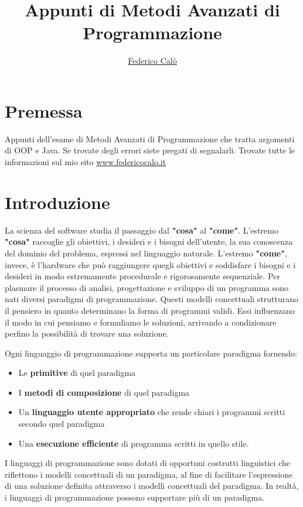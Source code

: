 \documentclass[a4paper,18pt]{extarticle}
\title{Appunti di Metodi Avanzati di Programmazione}
\author{\href{http://www.federicocalo.it}{Federico Calò} }
\date{}
\begin{document}
\maketitle

\newpage

\tableofcontents

\newpage
\section{ Premessa}
Appunti dell'esame di Metodi Avanzati di Programmazione che tratta argomenti di OOP e Java. Se trovate degli errori siete pregati di segnalarli. Trovate tutte le informazioni sul mio sito \href{http://www.federicocalo.it}{www.federicocalo.it}

\newpage
\section{ Introduzione}

La scienza del software studia il passaggio dal \textbf{"cosa"} al \textbf{"come"}. L'estremo \textbf{"cosa"} raccoglie gli obiettivi, i desideri e i bisogni dell'utente, la sua conoscenza del dominio del problema, espressi nel linguaggio naturale. L'estremo \textbf{"come"}, invece, è l'hardware che può raggiungere quegli obiettivi e soddisfare i bisogni e i desideri in modo estremamente procedurale e rigorosamente sequenziale. Per plasmare il processo di analisi, progettazione e sviluppo di un programma sono nati diversi paradigmi di programmazione. Questi modelli concettuali strutturano il pensiero in quanto determinano la forma di programmi validi. Essi influenzano il modo in cui pensiamo e formuliamo le soluzioni, arrivando a condizionare perfino la possibilità di trovare una soluzione.

Ogni linguaggio di programmazione supporta un particolare paradigma fornendo:

\begin{itemize}
  \item Le \textbf{primitive} di quel paradigma
  \item I \textbf{metodi di composizione} di quel paradigma
  \item Un \textbf{linguaggio utente appropriato} che rende chiari i programmi scritti secondo quel paradigma
  \item Una \textbf{esecuzione efficiente} di programma scritti in quello stile.
\end{itemize}

I linguaggi di programmazione sono dotati di opportuni costrutti linguistici che riflettono i modelli concettuali di un paradigma, al fine di facilitare l'espressione di una soluzione definita attraverso i modelli concettuali del paradigma. In realtà, i linguaggi di programmazione possono supportare più di un paradigma.
\end{document}
